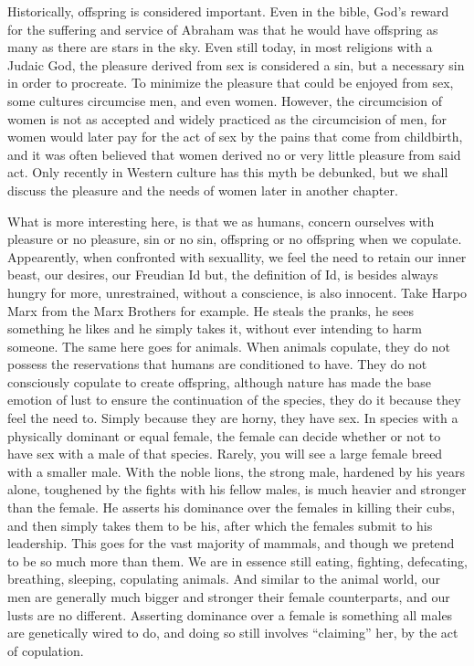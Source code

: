 Historically, offspring is considered important. Even in the bible, God's reward 
for the suffering and service of Abraham was that he would have offspring as 
many as there are stars in the sky. Even still today, in most religions with a 
Judaic God, the pleasure derived from sex is considered a sin, but a necessary 
sin in order to procreate. To minimize the pleasure that could be enjoyed from 
sex, some cultures circumcise men, and even women. However, the circumcision of 
women is not as accepted and widely practiced as the circumcision of men, for 
women would later pay for the act of sex by the pains that come from childbirth, 
and it was often believed that women derived no or very little pleasure from 
said act. Only recently in Western culture has this myth be debunked, but we 
shall discuss the pleasure and the needs of women later in another chapter.

What is more interesting here, is that we as humans, concern ourselves with 
pleasure or no pleasure, sin or no sin, offspring or no offspring when we 
copulate. Appearently, when confronted with sexuallity, we feel the need to 
retain our inner beast, our desires, our Freudian Id but, the definition of Id, 
is besides always hungry for more, unrestrained, without a conscience, is also 
innocent. Take Harpo Marx from the Marx Brothers for example. He steals the 
pranks, he sees something he likes and he simply takes it, without ever 
intending to harm someone. The same here goes for animals. When animals 
copulate, they do not possess the reservations that humans are conditioned to 
have. They do not consciously copulate to create offspring, although nature has 
made the base emotion of lust to ensure the continuation of the species, they do 
it because they feel the need to. Simply because they are horny, they have sex. 
In species with a physically dominant or equal female, the female can decide 
whether or not to have sex with a male of that species. Rarely, you will see a 
large female breed with a smaller male. With the noble lions, the strong male, 
hardened by his years alone, toughened by the fights with his fellow males, is 
much heavier and stronger than the female. He asserts his dominance over the 
females in killing their cubs, and then simply takes them to be his, after which 
the females submit to his leadership. This goes for the vast majority of 
mammals, and though we pretend to be so much more than them. We are in essence 
still eating, fighting, defecating, breathing, sleeping, copulating animals. And 
similar to the animal world, our men are generally much bigger and stronger 
their female counterparts, and our lusts are no different. Asserting dominance 
over a female is something all males are genetically wired to do, and doing so 
still involves “claiming” her, by the act of copulation.


